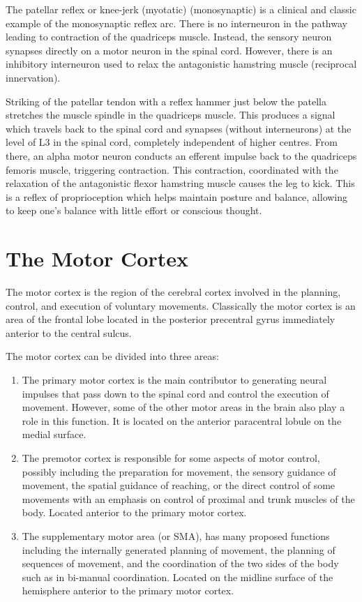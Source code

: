 The patellar reflex or knee-jerk (myotatic) (monosynaptic) is a clinical and classic example of the monosynaptic reflex arc. There is no interneuron in the pathway leading to contraction of the quadriceps muscle. Instead, the sensory neuron synapses directly on a motor neuron in the spinal cord. However, there is an inhibitory interneuron used to relax the antagonistic hamstring muscle (reciprocal innervation).

Striking of the patellar tendon with a reflex hammer just below the patella stretches the muscle spindle in the quadriceps muscle. This produces a signal which travels back to the spinal cord and synapses (without interneurons) at the level of L3 in the spinal cord, completely independent of higher centres. From there, an alpha motor neuron conducts an efferent impulse back to the quadriceps femoris muscle, triggering contraction. This contraction, coordinated with the relaxation of the antagonistic flexor hamstring muscle causes the leg to kick. This is a reflex of proprioception which helps maintain posture and balance, allowing to keep one's balance with little effort or conscious thought.

\hypertarget{the-motor-cortex}{%
\section{The Motor Cortex}\label{the-motor-cortex}}

The motor cortex is the region of the cerebral cortex involved in the planning, control, and execution of voluntary movements. Classically the motor cortex is an area of the frontal lobe located in the posterior precentral gyrus immediately anterior to the central sulcus.

The motor cortex can be divided into three areas:

\begin{enumerate}
\def\labelenumi{\arabic{enumi}.}
\tightlist
\item
  The primary motor cortex is the main contributor to generating neural impulses that pass down to the spinal cord and control the execution of movement. However, some of the other motor areas in the brain also play a role in this function. It is located on the anterior paracentral lobule on the medial surface.
\item
  The premotor cortex is responsible for some aspects of motor control, possibly including the preparation for movement, the sensory guidance of movement, the spatial guidance of reaching, or the direct control of some movements with an emphasis on control of proximal and trunk muscles of the body. Located anterior to the primary motor cortex.
\item
  The supplementary motor area (or SMA), has many proposed functions including the internally generated planning of movement, the planning of sequences of movement, and the coordination of the two sides of the body such as in bi-manual coordination. Located on the midline surface of the hemisphere anterior to the primary motor cortex.
\end{enumerate}


